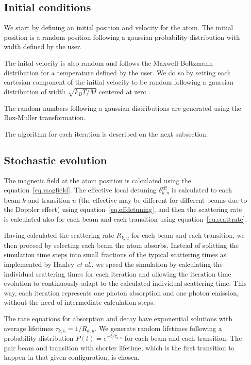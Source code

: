 \documentclass[12pt,a4paper,twoside]{article}
\begin{document}
\subsection{Initial conditions}

We start by defining an initial position and velocity for the atom. The initial position is a random position following a gaussian probability distribution with width defined by the user.

The inital velocity is also random and follows the Maxwell-Boltzmann distribution for a temperature defined by the user. We do so by setting each cartesian component of the initial velocity to be random following a gaussian distribution of width $\sqrt{k_B T/M}$ centered at zero .

The random numbers following a gaussian distributions are generated using the Box-Muller transformation.\cite{box1958note}

The algorithm for each iteration is described on the next subsection.

\subsection{Stochastic evolution}

The magnetic field at the atom position is calculated using the equation~\ref{eq.magfield}. The effective local detuning $\delta_{k,u}^\mathrm{eff}$ is calculated to each beam $k$ and transition $u$ (the effective may be different for different beams due to the Doppler effect) using equation~\ref{eq.effdetuning}, and then the scattering rate is calculated also for each beam and each transition using equation~\ref{eq.scattrate}.

Having calculated the scattering rate $R_{k,u}$ for each beam and each transition, we then proceed by selecting each beam the atom absorbs. Instead of splitting the simulation time steps into small fractions of the typical scattering times as implemented by Hanley \textit{et al.},\cite{hanley2018quantitative} we speed the simulation by calculating the individual scattering times for each iteration and allowing the iteration time evolution to continuously adapt to the calculated individual scattering time. This way, each iteration represents one photon absorption and one photon emission, without the need of intermediate calculation steps.

The rate equations for absorption and decay have exponential solutions with average lifetimes $\tau_{k,u} = 1/R_{k,u}$. We generate random lifetimes following a probability distribution $P(t) = e^{-t/\tau_{k,u}}$ for each beam and each transition. The pair beam and transition with shorter lifetime, which is the first transition to happen in that given configuration, is chosen.
\end{document}
